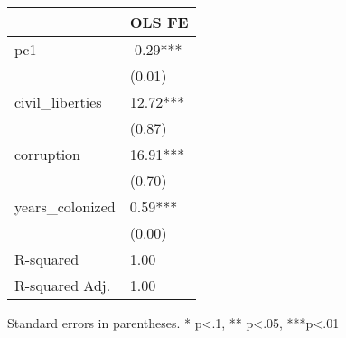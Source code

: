 \begin{table}
\caption{}
\label{}
\begin{center}
\begin{tabular}{ll}
\hline
                 & OLS FE    \\
\hline
pc1              & -0.29***  \\
                 & (0.01)    \\
civil\_liberties & 12.72***  \\
                 & (0.87)    \\
corruption       & 16.91***  \\
                 & (0.70)    \\
years\_colonized & 0.59***   \\
                 & (0.00)    \\
R-squared        & 1.00      \\
R-squared Adj.   & 1.00      \\
\hline
\end{tabular}
\end{center}
\end{table}
\bigskip
Standard errors in parentheses. \newline 
* p<.1, ** p<.05, ***p<.01